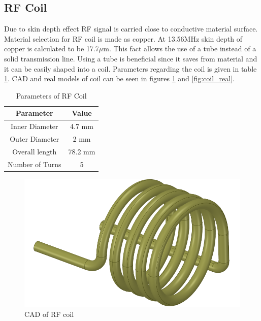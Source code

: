 \subsection{RF Coil}
Due to skin depth effect RF signal is carried close to conductive material surface. Material selection for RF coil is made as copper. At 13.56MHz skin depth of copper is calculated to be 17.7$\mu$m\cite{bowick2011rf}. This fact allows the use of a tube instead of a solid transmission line. Using a tube is beneficial since it saves from material and it can be easily shaped into a coil. Parameters regarding the coil is given in table \ref{table:RFcoil_params}. CAD and real models of coil can be seen in figures \ref{fig:coil_CAD} and \ref{fig:coil_real}.
\newpage
\begin{table}[ht]
    \centering
    \begin{tabular}{||c|c||}
        \hline
        \textbf{Parameter} & \textbf{Value} \\
        \hline
        Inner Diameter & 4.7 mm\\
        \hline
        Outer Diameter & 2 mm \\
        \hline
        Overall length & 78.2 mm \\
         \hline
        Number of Turns & 5 \\
        \hline
    \end{tabular}
    \caption{Parameters of RF Coil}
    \label{table:RFcoil_params}
\end{table}

\begin{figure}[ht]
    \centering
    \includegraphics[scale=0.35]{fig/coil_CAD.png}
    \caption{CAD of RF coil}
    \label{fig:coil_CAD}
\end{figure}

